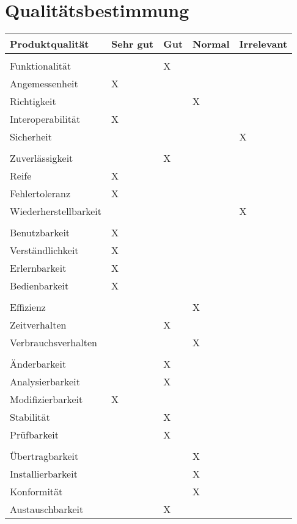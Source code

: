 \documentclass[pflichtenheft.tex]{subfiles}
\begin{document}
\chapter{Qualitätsbestimmung}

\begin{table}[H]
\begin{tabular}{ | l | >{\centering\arraybackslash}m{2.5cm} | >{\centering\arraybackslash}m{2.5cm} | >{\centering\arraybackslash}m{2.5cm} | >{\centering\arraybackslash}m{2.5cm} | }
    \hline
    \textbf{Produktqualität} & \textbf{Sehr gut} & \textbf{Gut} & \textbf{Normal} & 
    	\textbf{Irrelevant}\\ \hline
    &&&& \\
    \Large{Funktionalität}	&  & X &  &  \\    \hline
    Angemessenheit 			& X &  &  &  \\    \hline
    Richtigkeit    			&  &  & X &  \\    \hline
    Interoperabilität   	& X &  &  &  \\    \hline
    Sicherheit				&  &  &  & X \\    \hline
    &&&& \\
    \Large{Zuverlässigkeit} &  & X &  &  \\    \hline
    Reife					& X &  &  &  \\    \hline
    Fehlertoleranz			& X &  &  &  \\    \hline
    Wiederherstellbarkeit	&  &  &  & X \\    \hline
    &&&& \\
    \Large{Benutzbarkeit}	& X &  &  &  \\    \hline
    Verständlichkeit		& X &  &  &  \\    \hline
    Erlernbarkeit			& X &  &  &  \\    \hline
    Bedienbarkeit			& X &  &  &  \\    \hline
    &&&& \\
    \Large{Effizienz}		&  &  & X &  \\    \hline
    Zeitverhalten			&  & X &  &  \\    \hline
    Verbrauchsverhalten		&  &  & X &  \\    \hline
    &&&& \\
    \Large{Änderbarkeit}	&  & X &  &  \\    \hline
    Analysierbarkeit		&  & X &  &  \\    \hline
    Modifizierbarkeit		& X &  &  &  \\    \hline
    Stabilität				&  & X &  &  \\    \hline
    Prüfbarkeit				&  & X &  &  \\    \hline
    &&&& \\
    \Large{Übertragbarkeit}	&  &  & X &  \\    \hline
    Installierbarkeit		&  &  & X &  \\    \hline
    Konformität				&  &  & X &  \\    \hline
    Austauschbarkeit		&  & X &  &  \\    \hline
    

\end{tabular}
\end{table}
\end{document}
